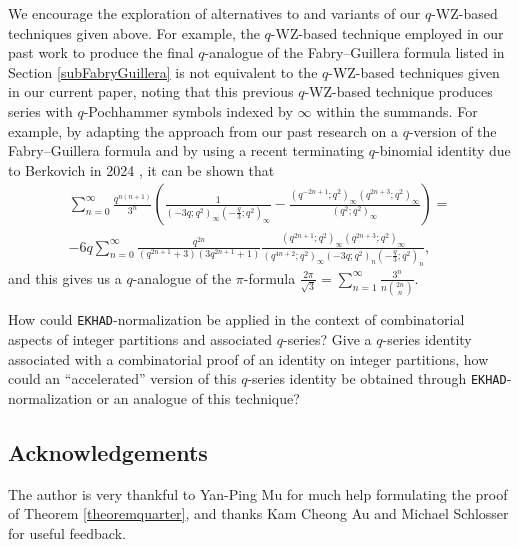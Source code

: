 \documentclass[12pt]{article}
\begin{document}
 We encourage the exploration of alternatives to and variants of our $q$-WZ-based techniques given above. For example, the
 $q$-WZ-based technique employed in our past work \cite{Campbell2025further} to produce the final $q$-analogue of the
 Fabry--Guillera formula listed in Section \ref{subFabryGuillera} is not equivalent to the $q$-WZ-based techniques given in our current 
 paper, noting that this previous $q$-WZ-based technique produces series with $q$-Pochhammer symbols indexed by $\infty$
 within the summands. For example, by adapting the approach from our past research on a $q$-version of the Fabry--Guillera formula 
 \cite{Campbell2025further} and by using a recent terminating $q$-binomial identity due to 
 Berkovich in 2024 \cite{Berkovich2024}, it can be shown that 
\begin{multline*}
 \sum_{n=0}^{\infty} \frac{q^{n(n+1)}}{3^n} 
 \left( \frac{1}{ \left( -3q;q^2 \right)_{\infty} \left( -\frac{q}{3}; q^2 \right)_{\infty} } 
 - \frac{ \left( q^{-2n+1};q^2 \right)_{\infty} \left( q^{2n+3};q^2 \right)_{\infty} }{ \left( q^2;q^2 \right)_{\infty} } 
 \right) = \\ 
 - 6 q \sum_{n=0}^{\infty} \frac{q^{2n}}{(q^{2n+1} + 3) (3 q^{2n+1} +1) } \frac{ 
 \left( q^{2n+1};q^2 \right)_{\infty} \left( q^{2n+3};q^2 \right)_{\infty} }{ \left( q^{4n+2};q^2 \right)_{\infty} 
 \left( -3q;q^2 \right)_{n} \left( -\frac{q}{3};q^2 \right)_{n}}, 
\end{multline*}
 and this gives us a $q$-analogue of the $\pi$-formula
 $\frac{2 \pi}{\sqrt{3}} = \sum_{n=1}^{\infty} \frac{3^n}{n \binom{2n}{n}}$. 
 
 How could {\tt EKHAD}-normalization be applied in the context of combinatorial aspects of integer partitions and associated $q$-series? 
 Give a $q$-series identity associated with a combinatorial proof 
 of an identity on integer partitions, how could an ``accelerated'' 
 version of this $q$-series identity be obtained through {\tt EKHAD}-normalization
 or an analogue of this technique? 

\subsection*{Acknowledgements}
 The author is very thankful to Yan-Ping Mu for much help formulating the proof of Theorem \ref{theoremquarter}, 
 and thanks Kam Cheong Au and Michael Schlosser for useful feedback. 
\end{document}
